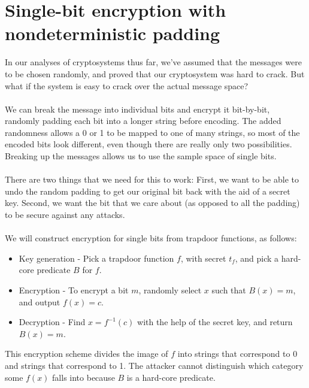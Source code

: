 \documentclass[10pt]{article}
\begin{document}
\section{Single-bit encryption with nondeterministic padding}
In our analyses of cryptosystems thus far, we've assumed that the messages were to be chosen randomly, and proved that our cryptosystem was hard to crack.  But what if the system is easy to crack over the actual message space?
\\ ~ \\
We can break the message into individual bits and encrypt it bit-by-bit, randomly padding each bit into a longer string before encoding.  The added randomness allows a 0 or 1 to be mapped to one of many strings, so most of the encoded bits look different, even though there are really only two possibilities.  Breaking up the messages allows us to use the sample space of single bits.
\\ ~ \\
There are two things that we need for this to work: First, we want to be able to undo the random padding to get our original bit back with the aid of a secret key.  Second, we want the bit that we care about (as opposed to all the padding) to be secure against any attacks.
\\ ~ \\
We will construct encryption for single bits from trapdoor functions, as follows:
\begin{itemize}
\item Key generation - Pick a trapdoor function $ f $, with secret $ t_f $, and pick a hard-core predicate $ B $ for $ f $.
\item Encryption - To encrypt a bit $ m $, randomly select $ x $ such that $ B(x) = m $, and output $ f(x) =  c $.
\item Decryption - Find $ x = f^{-1}(c) $ with the help of the secret key, and return $ B(x) = m $.
\end{itemize}
This encryption scheme divides the image of $ f $ into strings that correspond to 0 and strings that correspond to 1.  The attacker cannot distinguish which category some $ f(x) $ falls into because $ B $ is a hard-core predicate.
\end{document}
